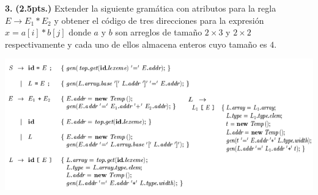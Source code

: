 \textbf{3.} \textbf{(2.5pts.)} Extender la siguiente gram\'atica con atributos para 
la regla $E \to E_1 * E_2$ y obtener el c\'odigo de tres direcciones para la 
expresi\'on $x = a[i] * b[j] $ donde $a$ y $b$ son arreglos de tama\~no 
$2\times 3$ y $2\times 2$ respectivamente y cada uno de ellos almacena enteros 
cuyo tama\~no es $4$.
\begin{center}
\includegraphics[width=.85\textwidth]{./ArrayRef}
\end{center}
